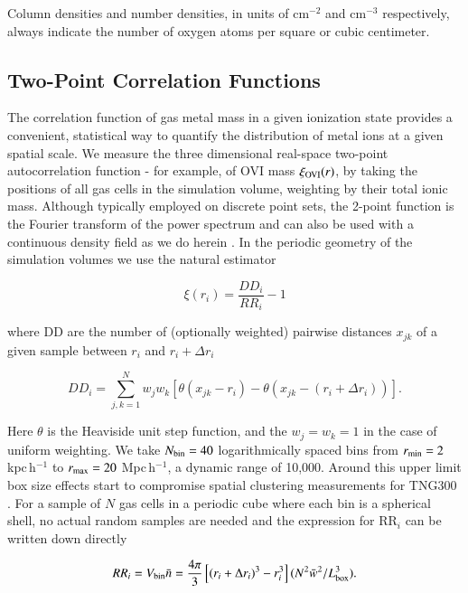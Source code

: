 \documentclass[useAMS,usenatbib]{mnras}
\newcommand{\ovi}{OVI\xspace}
\begin{document}
Column densities and number densities, in units of cm$^{-2}$ and cm$^{-3}$ respectively, always indicate the number of oxygen atoms per square or cubic centimeter. 

\subsection{Two-Point Correlation Functions} \label{sec_corrfuncs}

The correlation function of gas metal mass in a given ionization state provides a convenient, statistical way to quantify the distribution of metal ions at a given spatial scale. We measure the three dimensional real-space two-point autocorrelation function - for example, of \ovi mass $\xi_{\rm OVI}(r)$, by taking the positions of all gas cells in the simulation volume, weighting by their total ionic mass. Although typically employed on discrete point sets, the 2-point function is the Fourier transform of the power spectrum and can also be used with a continuous density field as we do herein \citep{peebles73}. In the periodic geometry of the simulation volumes we use the natural estimator 

\begin{equation}
\xi(r_i) = \frac{DD_i}{RR_i} - 1
\end{equation}

\noindent where DD are the number of (optionally weighted) pairwise distances $x_{jk}$ of a given sample between $r_i$ and $r_i+\Delta r_i$

\begin{equation}
DD_i = \sum_{j,k = 1}^{N} w_j w_k \left[ \theta \left(x_{jk} - r_i \right)- \theta \left(x_{jk} - (r_i+\Delta r_i)\right) \right].
\end{equation}

\noindent Here $\theta$ is the Heaviside unit step function, and the $w_j = w_k = 1$ in the case of uniform weighting. We take $N_{\rm bin} = 40$ logarithmically spaced bins from $r_{\rm min} = 2$ kpc\,h$^{-1}$ to $r_{\rm max} = 20$ Mpc\,h$^{-1}$, a dynamic range of 10,000. Around this upper limit box size effects start to compromise spatial clustering measurements for TNG300 \citep{springel18}. For a sample of $N$ gas cells in a periodic cube where each bin is a spherical shell, no actual random samples are needed and the expression for RR$_i$ can be written down directly

\begin{equation}
RR_i = V_{\rm bin} \bar{n} = \frac{4 \pi}{3} \left[ (r_i + \Delta r_i)^3 - r_i^3 \right] (N^2 \bar{w}^2 / L_{\rm box}^3).
\end{equation}
\end{document}
